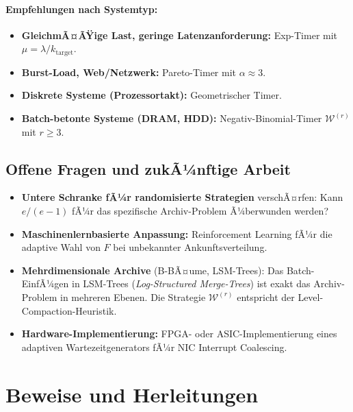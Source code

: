 ﻿\documentclass[12pt, a4paper]{article}
\begin{document}
\paragraph{Empfehlungen nach Systemtyp:}
\begin{itemize}[noitemsep]
  \item \textbf{GleichmÃ¤ÃŸige Last, geringe Latenzanforderung:}
        Exp-Timer mit $\mu = \lambda/k_{\mathrm{target}}$.
  \item \textbf{Burst-Load, Web/Netzwerk:}
        Pareto-Timer mit $\alpha \approx 3$.
  \item \textbf{Diskrete Systeme (Prozessortakt):}
        Geometrischer Timer.
  \item \textbf{Batch-betonte Systeme (DRAM, HDD):}
        Negativ-Binomial-Timer $\mathcal{W}^{(r)}$ mit $r \geq 3$.
\end{itemize}

\subsection{Offene Fragen und zukÃ¼nftige Arbeit}

\begin{itemize}[noitemsep]
  \item \textbf{Untere Schranke fÃ¼r randomisierte Strategien} verschÃ¤rfen:
        Kann $e/(e-1)$ fÃ¼r das spezifische Archiv-Problem Ã¼berwunden werden?
  \item \textbf{Maschinenlernbasierte Anpassung:} Reinforcement Learning fÃ¼r
        die adaptive Wahl von $F$ bei unbekannter Ankunftsverteilung.
  \item \textbf{Mehrdimensionale Archive} (B-BÃ¤ume, LSM-Trees): Das
        Batch-EinfÃ¼gen in LSM-Trees (\emph{Log-Structured Merge-Trees}) ist
        exakt das Archiv-Problem in mehreren Ebenen. Die Strategie
        $\mathcal{W}^{(r)}$ entspricht der Level-Compaction-Heuristik.
  \item \textbf{Hardware-Implementierung:} FPGA- oder ASIC-Implementierung
        eines adaptiven Wartezeitgenerators fÃ¼r NIC Interrupt Coalescing.
\end{itemize}

\appendix

\section{Beweise und Herleitungen}\label{app:proofs}
\end{document}
